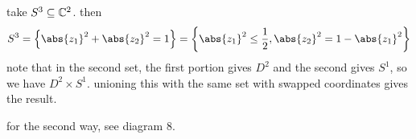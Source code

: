 take $S^{3}\subseteq\mathbb{C}^{2}$. then
\begin{equation*}
    S^{3}=\set{\abs{z_{1}}^{2}+\abs{z_{2}}^{2}=1}
    =\set{\abs{z_{1}}^{2}\leq\frac{1}{2},\abs{z_{2}}^{2}=1-\abs{z_{1}}^{2}}
\end{equation*}
note that in the second set, the first portion gives $D^{2}$ and the second gives
$S^{1}$, so we have $D^{2}\times S^{1}$.
unioning this with the same set with swapped coordinates gives the result.

for the second way, see diagram 8.



